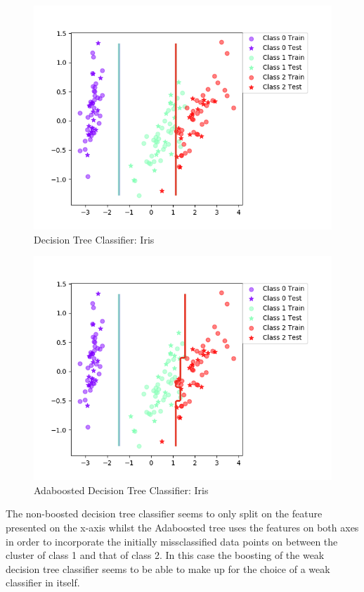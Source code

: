 \documentclass{article}
\begin{document}
\begin{figure}
    \centering
    \includegraphics[scale = 0.90]{Dectree.png}
    \caption{Decision Tree Classifier: Iris}
\end{figure}

\begin{figure}
    \centering
    \includegraphics[scale = 0.90]{BoostedDectree.png}
    \caption{Adaboosted Decision Tree Classifier: Iris}
\end{figure}

The non-boosted decision tree classifier seems to only split on the feature presented on the x-axis whilst the Adaboosted tree uses the features on both axes in order to incorporate the initially missclassified data points on between the cluster of class 1 and that of class 2. In this case the boosting of the weak decision tree classifier seems to be able to make up for the choice of a weak classifier in itself.
\end{document}
